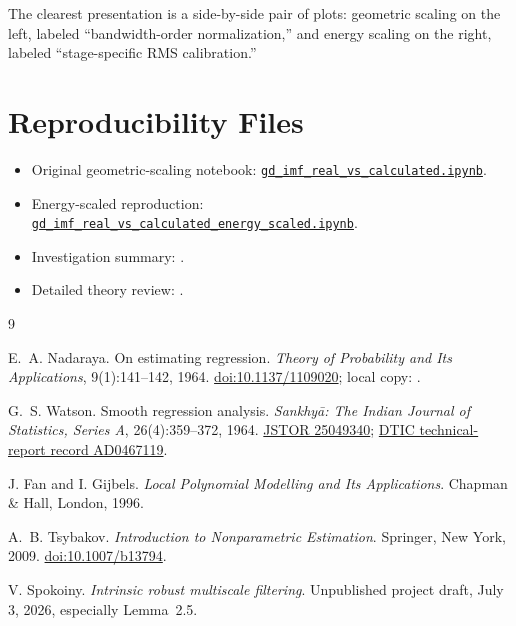 \documentclass[11pt]{article}
\begin{document}
The clearest presentation is a side-by-side pair of plots: geometric scaling on
the left, labeled ``bandwidth-order normalization,'' and energy scaling on the
right, labeled ``stage-specific RMS calibration.''

\section{Reproducibility Files}

\begin{itemize}
    \item Original geometric-scaling notebook:
    \href{https://github.com/mkuziuk/imf/blob/main/experiments/real-vs-calculated/gd_imf_real_vs_calculated.ipynb}{\texttt{gd\_imf\_real\_vs\_calculated.ipynb}}.
    \item Energy-scaled reproduction:
    \href{https://github.com/mkuziuk/imf/blob/main/experiments/real-vs-calculated/gd_imf_real_vs_calculated_energy_scaled.ipynb}{\texttt{gd\_imf\_real\_vs\_calculated\_energy\_scaled.ipynb}}.
    \item Investigation summary:
    .
    \item Detailed theory review:
    .
\end{itemize}

\begin{thebibliography}{9}

E.~A. Nadaraya.
On estimating regression.
\emph{Theory of Probability and Its Applications}, 9(1):141--142, 1964.
\href{https://doi.org/10.1137/1109020}{doi:10.1137/1109020};
local copy: .

G.~S. Watson.
Smooth regression analysis.
\emph{Sankhy\={a}: The Indian Journal of Statistics, Series A},
26(4):359--372, 1964.
\href{https://www.jstor.org/stable/25049340}{JSTOR 25049340};
\href{https://dtic.minsky.ai/index/AD0467119}{DTIC technical-report record
AD0467119}.

J. Fan and I. Gijbels.
\emph{Local Polynomial Modelling and Its Applications}.
Chapman \& Hall, London, 1996.

A.~B. Tsybakov.
\emph{Introduction to Nonparametric Estimation}.
Springer, New York, 2009.
\href{https://doi.org/10.1007/b13794}{doi:10.1007/b13794}.

V. Spokoiny.
\emph{Intrinsic robust multiscale filtering}.
Unpublished project draft, July 3, 2026, especially Lemma~2.5.

\end{thebibliography}
\end{document}
